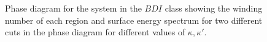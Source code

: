 \documentclass[twocolumn,amsmath,longbibliography,amssymb,superscriptaddress]{revtex4-1}
\begin{document}
\begin{figure}[h!]
\centering
{}\hspace{0mm}

\hspace{0mm}

\caption{Phase diagram for the system in the $BDI$ class showing the winding number of each region and surface energy spectrum for two different cuts in the phase diagram for different values of $\kappa,\kappa'$.}
\label{bdi_phase_diagram}
\end{figure}
\end{document}
